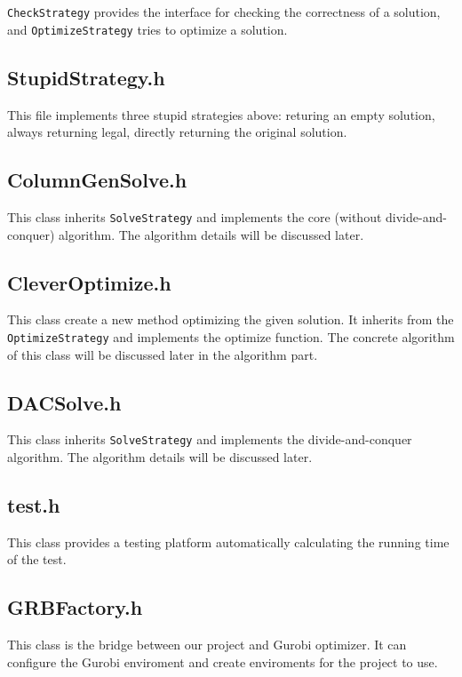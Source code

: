 \documentclass[12pt, a4paper]{article}
\begin{document}
			\texttt{CheckStrategy} provides the interface for checking the correctness of a solution, and \texttt{OptimizeStrategy} tries to optimize a solution.
		
		\subsection{StupidStrategy.h}
			
			This file implements three stupid strategies above: returing an empty solution, always returning legal, directly returning the original solution.
		
		\subsection{ColumnGenSolve.h}
		
			This class inherits \texttt{SolveStrategy} and implements the core (without divide-and-conquer) algorithm. The algorithm details will be discussed later.
		
		\subsection{CleverOptimize.h}
		
			This class create a new method optimizing the given solution. It inherits from the \texttt{OptimizeStrategy} and implements the optimize function. The concrete algorithm of this class will be discussed later in the algorithm part.
		
		\subsection{DACSolve.h}
		
			This class inherits \texttt{SolveStrategy} and implements the divide-and-conquer algorithm. The algorithm details will be discussed later.
		
		\subsection{test.h}
		
			This class provides a testing platform automatically calculating the running time of the test.
		
		\subsection{GRBFactory.h}
		
			This class is the bridge between our project and Gurobi optimizer. It can configure the Gurobi enviroment and create enviroments for the project to use.
		
\end{document}
